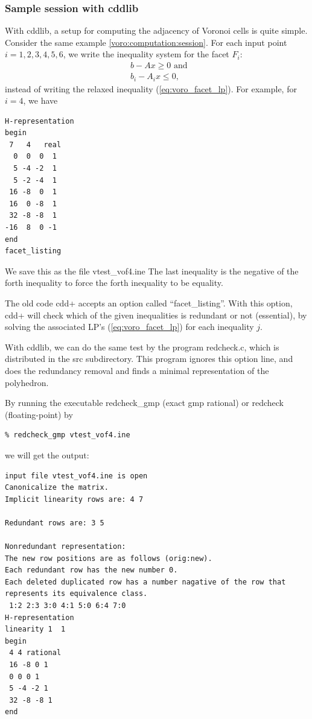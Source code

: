 \documentclass[a4paper,12pt]{article}
\newcommand{\HBrule}{\noindent \hrulefill \medskip}
\newcommand{\HTrule}{\medskip \noindent \hrulefill}
\begin{document}
\subsubsection{Sample session with cddlib}
\label{voro:adjacency:session}
\begin{small}
With cddlib, a setup for computing the adjacency of Voronoi cells is
quite simple.  Consider the same example
\ref{voro:computation:session}.  For each input point
$i=1,2,3,4,5,6$, we write the inequality system for the facet $F_i$:
\[
\begin{array}{ll}
& b -  A  x \ge 0 \text{ and }\\
& b_i -  A_i x \le 0 \text{,}
\end{array}
\]
instead of writing the relaxed inequality (\ref{eq:voro_facet_lp}).  
For example, for $i=4$, we have

\HTrule
\begin{verbatim}
H-representation
begin
 7   4   real
  0  0  0  1
  5 -4 -2  1
  5 -2 -4  1
 16 -8  0  1
 16  0 -8  1
 32 -8 -8  1
-16  8  0 -1
end
facet_listing
\end{verbatim}
\HBrule

\noindent
We save this as the file vtest\_vof4.ine
The last inequality is the negative of the forth inequality
to force the forth inequality to be equality.

The old code cdd+ accepts an option called ``facet\_listing''.  With
this option, cdd+ will check which of
the given inequalities is redundant or not (essential), by solving
the associated LP's  (\ref{eq:voro_facet_lp}) 
for each inequality $j$.

With cddlib,  we can do the same test by 
the program redcheck.c, which is distributed in
the src subdirectory.   This program ignores this option line, and
does the redundancy removal and finds a minimal representation of the polyhedron.

By running the executable  redcheck\_gmp (exact gmp rational) or redcheck (floating-point) by 

\begin{verbatim}
% redcheck_gmp vtest_vof4.ine
\end{verbatim}
we will get the output:

\HTrule
\begin{verbatim}
input file vtest_vof4.ine is open
Canonicalize the matrix.
Implicit linearity rows are: 4 7 

Redundant rows are: 3 5 

Nonredundant representation:
The new row positions are as follows (orig:new).
Each redundant row has the new number 0.
Each deleted duplicated row has a number nagative of the row that
represents its equivalence class.
 1:2 2:3 3:0 4:1 5:0 6:4 7:0
H-representation
linearity 1  1
begin
 4 4 rational
 16 -8 0 1
 0 0 0 1
 5 -4 -2 1
 32 -8 -8 1
end
\end{verbatim}
\HBrule


\end{small}
\end{document}
